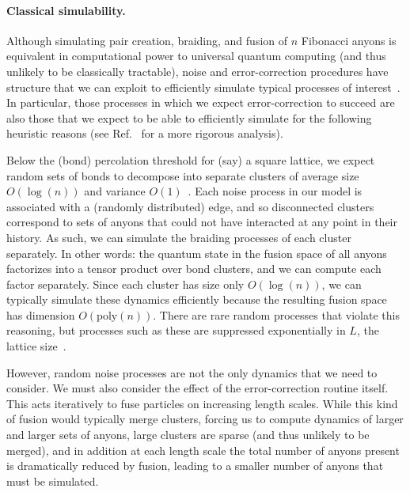 \documentclass[aps, prl, letterpaper, twocolumn, superscriptaddress, notitlepage, 10pt]{revtex4-1}
\begin{document}
	
\paragraph{Classical simulability.}

Although simulating pair creation, braiding, and fusion of $n$ Fibonacci anyons is equivalent in computational power to universal quantum computing (and thus unlikely to be classically tractable), noise and error-correction procedures have structure that we can exploit to efficiently simulate typical processes of interest~\cite{RGsim}. In particular, those processes in which we expect error-correction to succeed are also those that we expect to be able to efficiently 
simulate for the following heuristic reasons (see Ref.~\cite{RGsim} for a more rigorous analysis).

Below the (bond) percolation threshold for (say) a square lattice, we expect random sets of bonds to decompose into separate clusters of average size $O(\log(n))$ and variance $O(1)$~\cite{Bazant2000}.  Each noise process in our model is associated with a (randomly distributed) edge, and so disconnected clusters correspond to sets of anyons that could not have interacted at any point in their history. As such, we can simulate the braiding processes of each cluster separately. In other words: the quantum state in the fusion space of all anyons factorizes into a tensor product over bond clusters, and we can compute each factor separately. Since each cluster has size only $O(\log(n))$, we can typically simulate these dynamics efficiently because the resulting fusion space has dimension $O(\mathrm{poly}(n))$. There are rare random processes that violate this reasoning, but processes such as these are suppressed exponentially in $L$, the lattice size~\cite{Grimmett1989}. 

However, random noise processes are not the only dynamics that we need to consider. We must also consider the effect of the error-correction routine itself. This acts iteratively to fuse particles on increasing length scales. While this kind of fusion would typically merge clusters, forcing us to compute dynamics of larger and larger sets of anyons, large clusters are sparse (and thus unlikely to be merged), and in addition at each length scale the total number of anyons present is dramatically reduced by fusion, leading to a smaller number of anyons that must be simulated.
\end{document}
